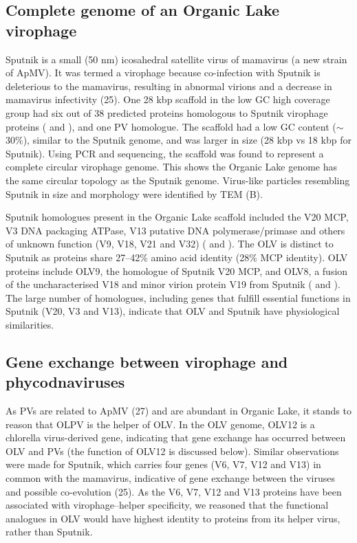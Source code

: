 \subsection{Complete genome of an Organic Lake virophage}
Sputnik is a small (50 nm) icosahedral satellite virus of mamavirus (a new strain of \ac{ApMV}). 
It was termed a virophage because co-infection with Sputnik is deleterious to the mamavirus, resulting in abnormal virions and a decrease in mamavirus infectivity (25). 
One 28 kbp scaffold in the low GC high coverage group had six out of 38 predicted proteins homologous to Sputnik virophage proteins ( and ), and one \ac{PV} homologue. 
The scaffold had a low GC content ($\sim$30\%), similar to the Sputnik genome, and was larger in size (28 kbp vs 18 kbp for Sputnik). 
Using \ac{PCR} and sequencing, the scaffold was found to represent a complete circular virophage genome.
This shows the Organic Lake genome has the same circular topology as the Sputnik genome. 
Virus-like particles resembling Sputnik in size and morphology were identified by \ac{TEM} (B).



Sputnik homologues present in the Organic Lake scaffold included the V20 \ac{MCP}, V3 \textsc{DNA} packaging \textsc{ATP}ase, V13 putative \textsc{DNA} polymerase/primase and others of unknown function (V9, V18, V21 and V32) ( and ). 
The \ac{OLV} is distinct to Sputnik as proteins share 27--42\% amino acid identity (28\% \ac{MCP} identity). 
\ac{OLV} proteins include OLV9, the homologue of Sputnik V20 \ac{MCP}, and OLV8, a fusion of the uncharacterised V18 and minor virion protein V19 from Sputnik ( and ). 
The large number of homologues, including genes that fulfill essential functions in Sputnik (V20, V3 and V13), indicate that \ac{OLV} and Sputnik have physiological similarities. 

\subsection{Gene exchange between virophage and phycodnaviruses}

As \acp{PV} are related to \ac{ApMV} (27) and are abundant in Organic Lake, it stands to reason that \ac{OLPV} is the helper of \ac{OLV}. 
In the \ac{OLV} genome, OLV12 is a chlorella virus-derived gene, indicating that gene exchange has occurred between \ac{OLV} and \acp{PV} (the function of OLV12 is discussed below). %
Similar observations were made for Sputnik, which carries four genes (V6, V7, V12 and V13) in common with the mamavirus, indicative of gene exchange between the viruses and possible co-evolution (25). 
As the V6, V7, V12 and V13 proteins have been associated with virophage--helper specificity, we reasoned that the functional analogues in \ac{OLV} would have highest identity to proteins from its helper virus, rather than Sputnik. 


